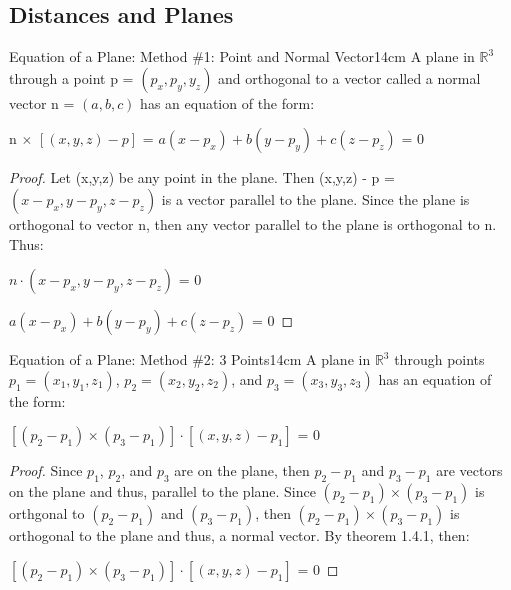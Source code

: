     \vspace{0.5cm}





\subsection{ Distances and Planes }

    \begin{wtheorem}{Equation of a Plane: Method \#1: Point and Normal Vector}{14cm}
        A plane in $\mathbb{R}^3$ through a point p = $(p_x,p_y,y_z)$
        and orthogonal to a vector called a normal vector
        n = $(a,b,c)$ has an equation of the form:

        \hspace{0.5cm}
        n $\times$ $[(x,y,z)-p]$ = $a(x-p_x) + b(y-p_y) + c(z-p_z)$ = 0
    \end{wtheorem}

    \begin{proof}
        Let (x,y,z) be any point in the plane.
        Then (x,y,z) - p = $(x-p_x,y-p_y,z-p_z)$ is a vector
        parallel to the plane. Since the plane is orthogonal to vector n,
        then any vector parallel to the plane is orthogonal to n. Thus:

        \hspace{0.5cm}
        $n \cdot (x-p_x,y-p_y,z-p_z)$ = 0

        \hspace{0.5cm}
        $ a(x-p_x) + b(y-p_y) + c(z-p_z)$ = 0
    \end{proof}

    \newpage



    \begin{wtheorem}{Equation of a Plane: Method \#2: 3 Points}{14cm}
        A plane in $\mathbb{R}^3$ through points
        $p_1 = (x_1,y_1,z_1)$, $p_2 = (x_2,y_2,z_2)$, and $p_3 = (x_3,y_3,z_3)$
        has an equation of the form:

        \hspace{0.5cm}
        $[(p_2 - p_1) \times (p_3 - p_1)] \cdot [(x,y,z) - p_1]$ = 0
    \end{wtheorem}

    \begin{proof}
        Since $p_1$, $p_2$, and $p_3$ are on the plane, then
        $p_2-p_1$ and $p_3-p_1$ are vectors on the plane and thus, parallel to
        the plane.
        Since $(p_2 - p_1) \times (p_3 - p_1)$ is orthgonal to
        $(p_2 - p_1)$ and $(p_3 - p_1)$, then $(p_2 - p_1) \times (p_3 - p_1)$
        is orthogonal to the plane and thus, a normal vector.
        By {\color{red} theorem 1.4.1}, then:

        \hspace{0.5cm}
        $[(p_2 - p_1) \times (p_3 - p_1)] \cdot [(x,y,z) - p_1]$ = 0
    \end{proof}

